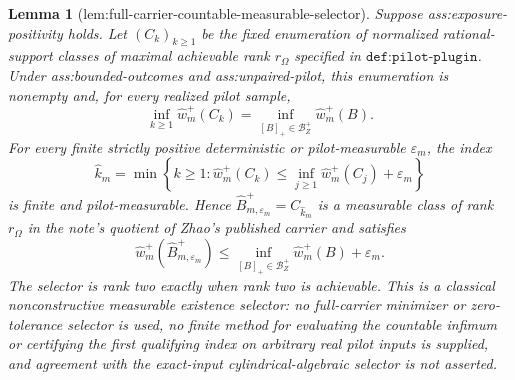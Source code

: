 \documentclass{article}
\newtheorem{lemma}{Lemma}
\begin{document}
\begin{lemma}[lem:full-carrier-countable-measurable-selector]\label{lem:full-carrier-countable-measurable-selector}
Suppose ass:exposure-positivity holds.  Let \((C_k)_{k\ge1}\) be the fixed enumeration of normalized rational-support classes of maximal achievable rank \(r_\Omega\) specified in \(\texttt{def:pilot-plugin}\).  Under ass:bounded-outcomes and ass:unpaired-pilot, this enumeration is nonempty and, for every realized pilot sample,
\[
 \inf_{k\ge1}\widehat w_m^+(C_k)
 =\inf_{[B]_+\in\mathcal B_Z^+}\widehat w_m^+(B).
\]
For every finite strictly positive deterministic or pilot-measurable \(\varepsilon_m\), the index
\[
 \widehat k_m=
 \min\left\{k\ge1:
 \widehat w_m^+(C_k)
 \le \inf_{j\ge1}\widehat w_m^+(C_j)+\varepsilon_m
 \right\}
\]
is finite and pilot-measurable.  Hence \(\widehat B_{m,\varepsilon_m}^+=C_{\widehat k_m}\) is a measurable class of rank \(r_\Omega\) in the note's quotient of Zhao's published carrier and satisfies
\[
 \widehat w_m^+(\widehat B_{m,\varepsilon_m}^+)
 \le
 \inf_{[B]_+\in\mathcal B_Z^+}\widehat w_m^+(B)+\varepsilon_m.
\]
The selector is rank two exactly when rank two is achievable.  This is a classical nonconstructive measurable existence selector: no full-carrier minimizer or zero-tolerance selector is used, no finite method for evaluating the countable infimum or certifying the first qualifying index on arbitrary real pilot inputs is supplied, and agreement with the exact-input cylindrical-algebraic selector is not asserted.
\end{lemma}
\end{document}
